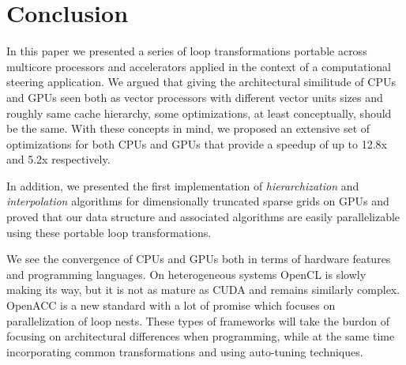 \section{Conclusion}
\label{sec:conclusion}

In this paper we presented a series of loop transformations portable across
multicore processors and accelerators applied in the context of a computational
steering application. We argued that giving the architectural similitude of CPUs
and GPUs seen both as vector processors with different vector units sizes and roughly
same cache hierarchy, some optimizations, at least conceptually, should be the
same. With these concepts in mind, we proposed an extensive set of optimizations
for both CPUs and GPUs that provide a speedup of up to 12.8x and 5.2x
respectively.

In addition, we presented the first implementation of \textit{hierarchization} and
\textit{interpolation} algorithms for dimensionally truncated sparse grids on GPUs
and proved that our data structure and associated algorithms are easily 
parallelizable using these portable loop transformations.

We see the convergence of CPUs and GPUs both in terms of hardware features and
programming languages. On heterogeneous systems OpenCL \cite{opencl} is slowly
making its way, but it is not as mature as CUDA and remains similarly complex.
OpenACC \cite{openacc} is a new standard with a lot of promise which focuses on
parallelization of loop nests. These types of frameworks will take the burdon
of focusing on architectural differences when programming, while at the same
time incorporating common transformations and using auto-tuning techniques.
